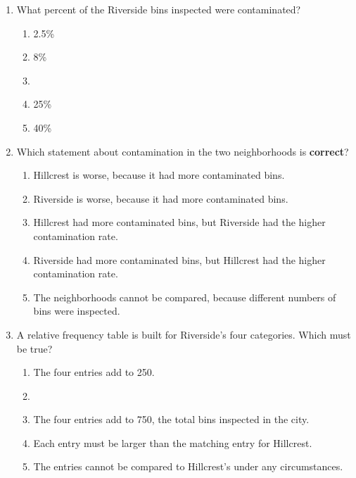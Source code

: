 \documentclass[12pt]{article}
\begin{document}
\begin{enumerate}[leftmargin=1.9em, itemsep=0.13in]

  \item What percent of the Riverside bins inspected were contaminated?
        \begin{enumerate}[label=\textbf{(\Alph*)}, leftmargin=2.2em, itemsep=2pt]
          \item 2.5\%
          \item 8\%
          \item {}
          \item 25\%
          \item 40\%
                \hfill{}
        \end{enumerate}

  \item Which statement about contamination in the two neighborhoods is \textbf{correct}?
        \begin{enumerate}[label=\textbf{(\Alph*)}, leftmargin=2.2em, itemsep=2pt]
          \item Hillcrest is worse, because it had more contaminated bins.
          \item Riverside is worse, because it had more contaminated bins.
          \item \textcolor{keyred}{Hillcrest had more contaminated bins, but Riverside had the higher
                contamination rate.}  %
          \item Riverside had more contaminated bins, but Hillcrest had the higher
                contamination rate.
          \item The neighborhoods cannot be compared, because different numbers of bins
                were inspected.
                \par\rule{0pt}{0.25in}\hfill{}
        \end{enumerate}

  \boxguard[9]
  \item A relative frequency table is built for Riverside's four categories. Which must
        be true?
        \begin{enumerate}[label=\textbf{(\Alph*)}, leftmargin=2.2em, itemsep=2pt]
          \item The four entries add to 250.
          \item {}
          \item The four entries add to 750, the total bins inspected in the city.
          \item Each entry must be larger than the matching entry for Hillcrest.
          \item The entries cannot be compared to Hillcrest's under any circumstances.
                \hfill{}
        \end{enumerate}


\end{enumerate}
\end{document}
